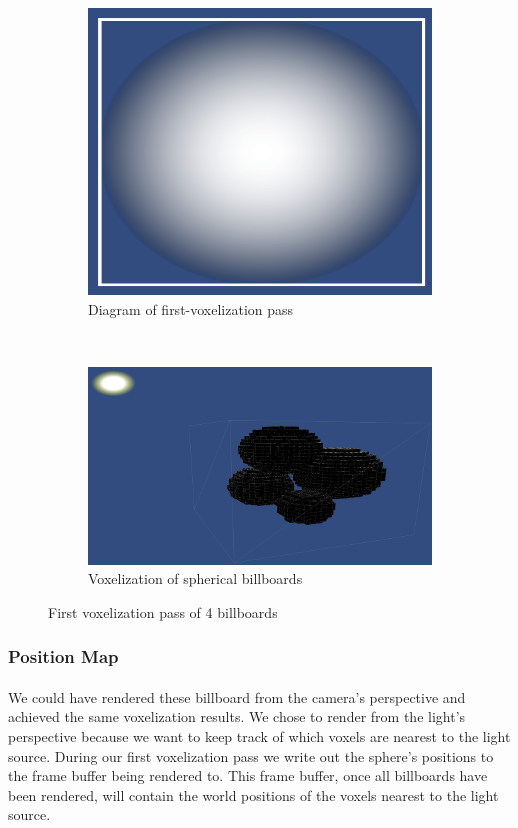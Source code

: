 \begin{figure}[t]
\begin{subfigure}[t]{0.48\textwidth}
	\includegraphics[width=\textwidth]{../res/spherebillboard.png}
	\caption{Diagram of first-voxelization pass}
	\end{subfigure}
	~
	\begin{subfigure}[t]{0.48\textwidth}
	\includegraphics[width=\textwidth]{../res/voxelize1.png}
	\caption{Voxelization of spherical billboards}
	\end{subfigure}

\caption{First voxelization pass of 4 billboards}
\end{figure}

\newpage
\subsubsection{Position Map}\paragraph{}
We could have rendered these billboard from the camera's perspective and achieved the same voxelization results. We chose to render from the light's perspective because we want to keep track of which voxels are nearest to the light source. 
During our first voxelization pass we write out the sphere's positions to the frame buffer being rendered to. This frame buffer, once all billboards have been rendered, will contain the world positions of the voxels nearest to the light source. 

